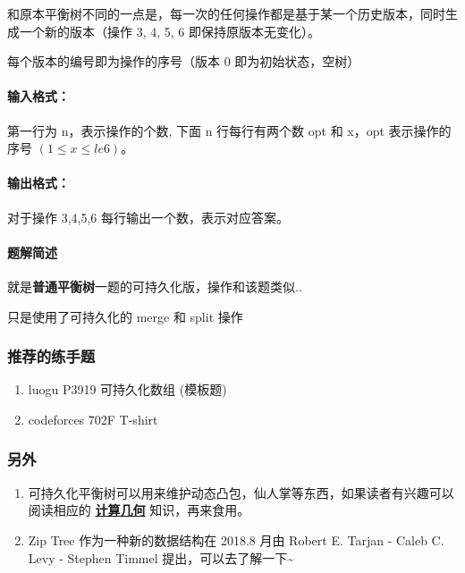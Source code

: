 和原本平衡树不同的一点是，每一次的任何操作都是基于某一个历史版本，同时生成一个新的版本（操作 3, 4, 5, 6 即保持原版本无变化）。

每个版本的编号即为操作的序号（版本 0 即为初始状态，空树）

\paragraph{输入格式：}

第一行为 n，表示操作的个数, 下面 n 行每行有两个数 opt 和 x，opt 表示操作的序号 $(1 \leq x \leq  le6)$。

\paragraph{输出格式：}

对于操作 3,4,5,6 每行输出一个数，表示对应答案。

\paragraph{题解简述}

就是\textbf{普通平衡树}一题的可持久化版，操作和该题类似..

只是使用了可持久化的 merge 和 split 操作

\subsubsection{推荐的练手题}

\begin{enumerate}
\item luogu P3919 可持久化数组 (模板题)
\item codeforces 702F T-shirt
\end{enumerate}

\subsubsection{另外}

\begin{enumerate}
\item 可持久化平衡树可以用来维护动态凸包，仙人掌等东西，如果读者有兴趣可以阅读相应的 \href{/geometry}{\textbf{计算几何}} 知识，再来食用。
\item Zip Tree 作为一种新的数据结构在 2018.8 月由 Robert E. Tarjan -  Caleb C. Levy - Stephen Timmel 提出，可以去了解一下\textasciitilde{}
\end{enumerate}

